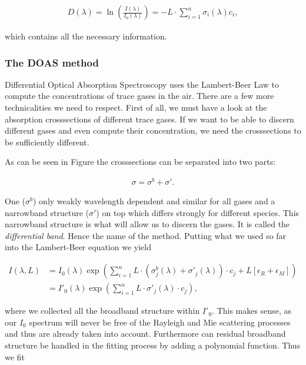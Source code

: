 \begin{align*}
  D(\lambda) = \ln \left(\frac{I(\lambda)}{I_0(\lambda)}\right) = - L
  \cdot \sum_{i=1}^n \sigma_i(\lambda) c_i,
\end{align*}

which contains all the necessary information.

\subsubsection{The DOAS method}
\label{sec:doas}


Differential Optical Absorption Spectroscopy uses the Lambert-Beer Law
to compute the concentrations of trace gases in the air. There are a
few more technicalities we need to respect. First of all, we must have
a look at the absorption crosssections of different trace gases. If we
want to be able to discern different gases and even compute their
concentration, we need the crosssections to be sufficiently
different.

As can be seen in Figure  the
crosssections can be separated into two parts: 

\begin{align*}
  \sigma = \sigma^b + \sigma'.
\end{align*}

One ($\sigma^b$) only weakly
wavelength dependent and similar for all gases and a narrowband
structure ($\sigma'$) on top which differs strongly for different species. This
narrowband structure is what will allow us to discern the gases. It is
called the \emph{differential band}. Hence the name of the
method. Putting what we used so far into the Lambert-Beer equation we
yield

\begin{align*}
  I(\lambda, L) & = I_0(\lambda) \exp \left ( \sum_{i=1}^n L \cdot
                  (\sigma^b_j(\lambda) + \sigma'_j(\lambda))\cdot c_j + L[\epsilon_R +
                  \epsilon_M]\right) \\
                & = I'_0(\lambda) \exp \left( \sum_{i=1}^n L \cdot
                  \sigma'_j(\lambda) \cdot c_j \right),
\end{align*}

where we collected all the broadband structure within $I'_0$. This
makes sense, as our $I_0$ spectrum will never be free of the Rayleigh
and Mie scattering processes and thus are already taken into
account. Furthermore can residual broadband structure be handled in
the fitting process by adding a polynomial function. Thus we fit

